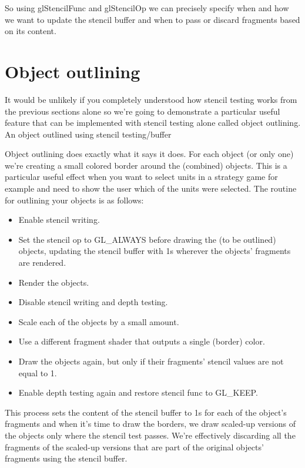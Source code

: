 \documentclass{article}
\begin{document}
So using glStencilFunc and glStencilOp we can precisely specify when and how we want to update the stencil buffer and when to pass or discard fragments based on its content.

\section{Object outlining}

It would be unlikely if you completely understood how stencil testing works from the previous sections alone so we're going to demonstrate a particular useful feature that can be implemented with stencil testing alone called object outlining.
An object outlined using stencil testing/buffer

Object outlining does exactly what it says it does. For each object (or only one) we're creating a small colored border around the (combined) objects. This is a particular useful effect when you want to select units in a strategy game for example and need to show the user which of the units were selected. The routine for outlining your objects is as follows:

\begin{itemize}
    \item Enable stencil writing.
    \item Set the stencil op to GL\_ALWAYS before drawing the (to be outlined) objects, updating the stencil buffer with 1s wherever the objects' fragments are rendered.
    \item Render the objects.
    \item Disable stencil writing and depth testing.
    \item Scale each of the objects by a small amount.
    \item Use a different fragment shader that outputs a single (border) color.
    \item Draw the objects again, but only if their fragments' stencil values are not equal to 1.
    \item Enable depth testing again and restore stencil func to GL\_KEEP.
\end{itemize}

This process sets the content of the stencil buffer to 1s for each of the object's fragments and when it's time to draw the borders, we draw scaled-up versions of the objects only where the stencil test passes. We're effectively discarding all the fragments of the scaled-up versions that are part of the original objects' fragments using the stencil buffer.
\end{document}
